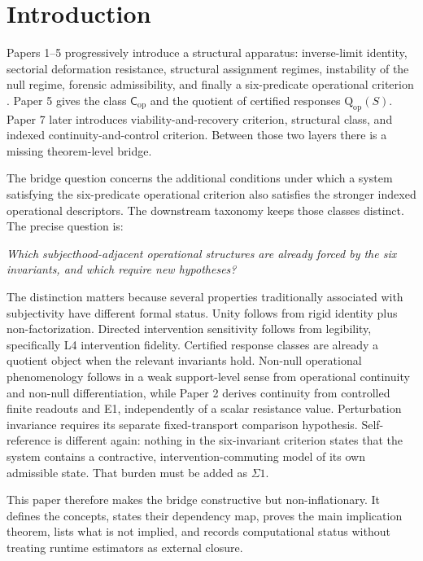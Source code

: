 \documentclass[11pt,a4paper]{article}
\theoremstyle{definition}
\newcommand{\Cop}{\mathsf{C}_{\mathrm{op}}}
\newcommand{\Qop}{\mathrm{Q}_{\mathrm{op}}}
\begin{document}
\section{Introduction}

Papers 1--5 progressively introduce a structural apparatus: inverse-limit identity, sectorial deformation resistance, structural assignment regimes, instability of the null regime, forensic admissibility, and finally a six-predicate operational criterion \cite{paper1,paper2,paper3,paper4,paper5}. Paper 5 gives the class $\Cop$ and the quotient of certified responses $\Qop(S)$. Paper 7 later introduces viability-and-recovery criterion, structural class, and indexed continuity-and-control criterion. Between those two layers there is a missing theorem-level bridge.

The bridge question concerns the additional conditions under which a system satisfying the six-predicate operational criterion also satisfies the stronger indexed operational descriptors. The downstream taxonomy keeps those classes distinct. The precise question is:

\begin{center}
\emph{Which subjecthood-adjacent operational structures are already forced by the six invariants, and which require new hypotheses?}
\end{center}

The distinction matters because several properties traditionally associated with subjectivity have different formal status. Unity follows from rigid identity plus non-factorization. Directed intervention sensitivity follows from legibility, specifically L4 intervention fidelity. Certified response classes are already a quotient object when the relevant invariants hold. Non-null operational phenomenology follows in a weak support-level sense from operational continuity and non-null differentiation, while Paper 2 derives continuity from controlled finite readouts and E1,
independently of a scalar resistance value. Perturbation invariance requires
its separate fixed-transport comparison hypothesis. Self-reference is different again: nothing in the six-invariant criterion states that the system contains a contractive, intervention-commuting model of its own admissible state. That burden must be added as $\Sigma1$.

This paper therefore makes the bridge constructive but non-inflationary. It defines the concepts, states their dependency map, proves the main implication theorem, lists what is not implied, and records computational status without treating runtime estimators as external closure.
\end{document}
